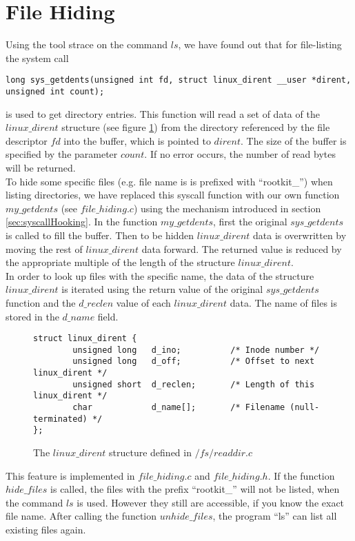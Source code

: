 \section{File Hiding}
Using the tool strace on the command $ls$, we have found out that for file-listing the system call 
\begin{center}
\lstset{escapechar=,style=customc}
\begin{lstlisting}
long sys_getdents(unsigned int fd, struct linux_dirent __user *dirent, unsigned int count);
\end{lstlisting}
\end{center}
is used to get directory entries. This function will read a set of data of the $linux\_dirent$ structure (see figure \ref{ls:dirent}) from the directory referenced by the file descriptor $fd$ into the buffer, which is pointed to $dirent$. The size of the buffer is specified by the parameter $count$. If no error occurs, the number of read bytes will be returned.\\
To hide some specific files (e.g. file name is is prefixed with ``rootkit\_'') when listing directories, we have replaced this syscall function with our own function $my\_getdents$ (see $file\_hiding.c$) using the mechanism introduced in section \ref{sec:syscallHooking}. In the function $my\_getdents$, first the original $sys\_getdents$ is called to fill the buffer. Then to be hidden $linux\_dirent$ data is overwritten by moving the rest of $linux\_dirent$ data forward. The returned value is reduced by the appropriate multiple of the length of the structure $linux\_dirent$.\\ 
In order to look up files with the specific name, the data of the structure $linux\_dirent$ is iterated using the return value of the original $sys\_getdents$ function and the $d\_reclen$ value of each $linux\_dirent$ data. The name of files is stored in the $d\_name$ field. 
\begin{center}
\begin{figure}
\lstset{escapechar=,style=customc}
\begin{lstlisting}
struct linux_dirent {
        unsigned long   d_ino;		 	/* Inode number */
        unsigned long   d_off;  		/* Offset to next linux_dirent */
        unsigned short  d_reclen;		/* Length of this linux_dirent */
        char            d_name[];		/* Filename (null-terminated) */
};
\end{lstlisting}
\caption{The $linux\_dirent$ structure defined in $/fs/readdir.c$}
\label{ls:dirent}
\end{figure}
\end{center}
This feature is implemented in $file\_hiding.c$ and $file\_hiding.h$. If the function $hide\_files$ is called, the files with the prefix ``rootkit\_'' will not be listed, when the command $ls$ is used. However they still are accessible, if you know the exact file name. After calling the function $unhide\_files$, the program ``ls'' can list all existing files again. 
